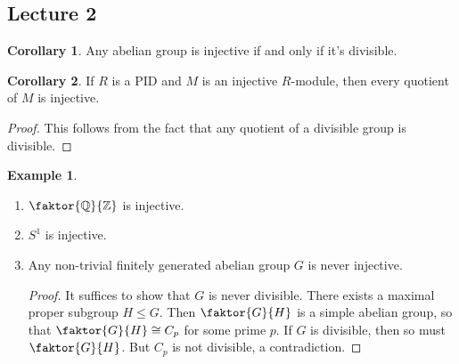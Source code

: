 \documentclass[10pt,letterpaper,cm]{nupset}
\theoremstyle{definition}
\newtheorem{exmp}{Example}
\newtheorem{corollary}{Corollary}
\newcommand{\Q}{\mathbb Q}
\newcommand{\Z}{\mathbb Z}
\newcommand{\1}{\mathbf{1}}
\newcommand{\0}{\vec 0}
\begin{document}
\subsection{Lecture 2}

\begin{corollary}
Any abelian group is injective if and only if it's divisible. 
\end{corollary}

\begin{corollary}
If $R$ is a PID and $M$ is an injective $R$-module, then every quotient of $M$ is injective.
\end{corollary}
\begin{proof}
This follows from the fact that any quotient of a divisible group is divisible.
\end{proof}

\begin{exmp} $ $
\begin{enumerate}
\item $\faktor{\Q}{\Z}$ is injective.
\item $S^1$ is injective.
\item Any non-trivial finitely generated abelian group $G$ is never injective.
\begin{proof}
It suffices to show that $G$ is never divisible. There exists a maximal proper subgroup $H\leq G$. Then $\faktor{G}{H}$ is a simple abelian group, so that $\faktor{G}{H} \cong C_p$ for some prime $p$. If $G$ is divisible, then so must $\faktor{G}{H}$. But $C_p$ is not divisible, a contradiction. 
\end{proof}
\end{enumerate}
\end{exmp}
\end{document}
